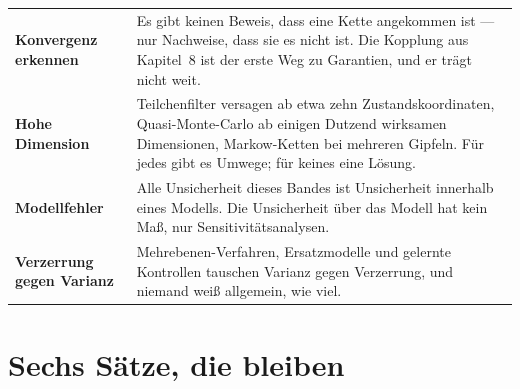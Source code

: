\begin{merksatz}
\begin{center}
{\small
\renewcommand{\arraystretch}{1.5}
\begin{tabular}{@{}P{3.2cm}P{5.4cm}@{}}
\toprule
\textbf{Konvergenz erkennen} & Es gibt keinen Beweis, dass eine Kette angekommen ist --- nur Nachweise, dass sie es nicht ist. Die Kopplung aus Kapitel~8 ist der erste Weg zu Garantien, und er trägt nicht weit.\\
\textbf{Hohe Dimension} & Teilchenfilter versagen ab etwa zehn Zustandskoordinaten, Quasi-Monte-Carlo ab einigen Dutzend wirksamen Dimensionen, Markow-Ketten bei mehreren Gipfeln. Für jedes gibt es Umwege; für keines eine Lösung.\\
\textbf{Modellfehler} & Alle Unsicherheit dieses Bandes ist Unsicherheit innerhalb eines Modells. Die Unsicherheit über das Modell hat kein Maß, nur Sensitivitätsanalysen.\\
\textbf{Verzerrung gegen Varianz} & Mehrebenen-Verfahren, Ersatzmodelle und gelernte Kontrollen tauschen Varianz gegen Verzerrung, und niemand weiß allgemein, wie viel.\\
\bottomrule
\end{tabular}}
\end{center}

\begin{center}
\begin{minipage}{0.88\textwidth}
\end{minipage}
\end{center}
\end{merksatz}

\section{Sechs Sätze, die bleiben}

